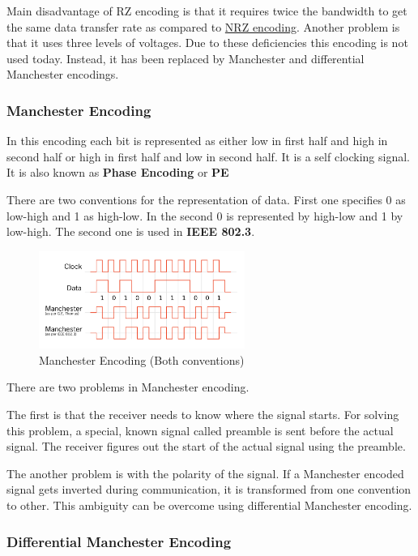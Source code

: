 Main disadvantage of RZ encoding is that it requires twice the bandwidth to get the same data transfer rate as compared to \hyperref[NRZ]{NRZ encoding}. Another problem is that it uses three levels of voltages. Due to these deficiencies this encoding is not used today. Instead, it has been replaced by Manchester and differential Manchester encodings.

\subsubsection{Manchester Encoding}
In this encoding each bit is represented as either low in first half and high in second half or high in first half and low in second half. It is a self clocking signal.
It is also known as \textbf{Phase Encoding} or \textbf{PE}

There are two conventions for the representation of data. First one specifies 0 as low-high and 1 as high-low. In the second 0 is represented by high-low and 1 by low-high. The second one is used in \textbf{IEEE 802.3}.

\begin{figure}[H]
    \centering
    \includegraphics[width=0.6\textwidth]{img/manchester.png}
    \caption{Manchester Encoding (Both conventions)}
    \label{fig:manchester}
\end{figure}

There are two problems in Manchester encoding.

The first is that the receiver needs to know where the signal starts. For solving this problem, a special, known signal called preamble is sent before the actual signal. The receiver figures out the start of the actual signal using the preamble.

The another problem is with the polarity of the signal. If a Manchester encoded signal gets inverted during communication, it is transformed from one convention to other. This ambiguity can be overcome using differential Manchester encoding.

\subsubsection{Differential Manchester Encoding}

